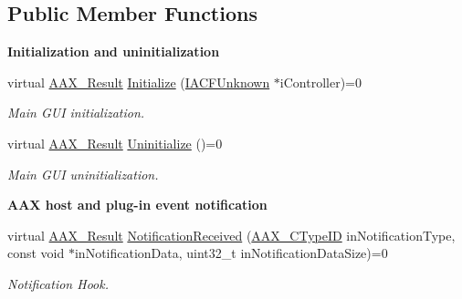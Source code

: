 \subsection*{Public Member Functions}
\begin{Indent}\textbf{ Initialization and uninitialization}\par
\begin{DoxyCompactItemize}
\item 
virtual \mbox{\hyperlink{a00392_a4d8f69a697df7f70c3a8e9b8ee130d2f}{A\+A\+X\+\_\+\+Result}} \mbox{\hyperlink{a01665_aac9d8ab88172ac594d86ac2441522fec}{Initialize}} (\mbox{\hyperlink{a01409}{I\+A\+C\+F\+Unknown}} $\ast$i\+Controller)=0
\begin{DoxyCompactList}\small\item\em Main G\+UI initialization. \end{DoxyCompactList}\item 
virtual \mbox{\hyperlink{a00392_a4d8f69a697df7f70c3a8e9b8ee130d2f}{A\+A\+X\+\_\+\+Result}} \mbox{\hyperlink{a01665_ab7d1c3c80a60637f9a9fd1860fe418cb}{Uninitialize}} ()=0
\begin{DoxyCompactList}\small\item\em Main G\+UI uninitialization. \end{DoxyCompactList}\end{DoxyCompactItemize}
\end{Indent}
\begin{Indent}\textbf{ A\+AX host and plug-\/in event notification}\par
\begin{DoxyCompactItemize}
\item 
virtual \mbox{\hyperlink{a00392_a4d8f69a697df7f70c3a8e9b8ee130d2f}{A\+A\+X\+\_\+\+Result}} \mbox{\hyperlink{a01665_a11a15162cb3c7019d1fabf2994fba6c6}{Notification\+Received}} (\mbox{\hyperlink{a00392_ac678f9c1fbcc26315d209f71a147a175}{A\+A\+X\+\_\+\+C\+Type\+ID}} in\+Notification\+Type, const void $\ast$in\+Notification\+Data, uint32\+\_\+t in\+Notification\+Data\+Size)=0
\begin{DoxyCompactList}\small\item\em Notification Hook. \end{DoxyCompactList}\end{DoxyCompactItemize}
\end{Indent}
